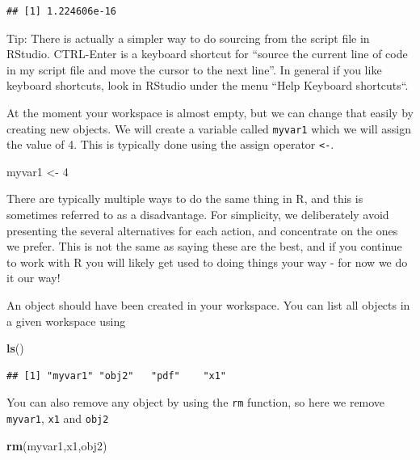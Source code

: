 \documentclass[]{book}
\newenvironment{Shaded}{\begin{snugshade}}{\end{snugshade}}
\newcommand{\KeywordTok}[1]{\textcolor[rgb]{0.13,0.29,0.53}{\textbf{#1}}}
\newcommand{\DecValTok}[1]{\textcolor[rgb]{0.00,0.00,0.81}{#1}}
\newcommand{\StringTok}[1]{\textcolor[rgb]{0.31,0.60,0.02}{#1}}
\newcommand{\NormalTok}[1]{#1}
\theoremstyle{definition}
\theoremstyle{definition}
\theoremstyle{remark}
\begin{document}
\begin{verbatim}
## [1] 1.224606e-16
\end{verbatim}

Tip: There is actually a simpler way to do sourcing from the script file
in RStudio. CTRL-Enter is a keyboard shortcut for ``source the current
line of code in my script file and move the cursor to the next line''.
In general if you like keyboard shortcuts, look in RStudio under the
menu ``Help \textbar{} Keyboard shortcuts``.

At the moment your workspace is almost empty, but we can change that
easily by creating new objects. We will create a variable called
\texttt{myvar1} which we will assign the value of 4. This is typically
done using the assign operator \texttt{\textless{}-}.

\begin{Shaded}
\begin{Highlighting}[]
\NormalTok{myvar1 <-}\StringTok{ }\DecValTok{4}
\end{Highlighting}
\end{Shaded}

There are typically multiple ways to do the same thing in R, and this is
sometimes referred to as a disadvantage. For simplicity, we deliberately
avoid presenting the several alternatives for each action, and
concentrate on the ones we prefer. This is not the same as saying these
are the best, and if you continue to work with R you will likely get
used to doing things your way - for now we do it our way!

An object should have been created in your workspace. You can list all
objects in a given workspace using

\begin{Shaded}
\begin{Highlighting}[]
\KeywordTok{ls}\NormalTok{()}
\end{Highlighting}
\end{Shaded}

\begin{verbatim}
## [1] "myvar1" "obj2"   "pdf"    "x1"
\end{verbatim}

You can also remove any object by using the \texttt{rm} function, so
here we remove \texttt{myvar1}, \texttt{x1} and \texttt{obj2}

\begin{Shaded}
\begin{Highlighting}[]
\KeywordTok{rm}\NormalTok{(myvar1,x1,obj2)}
\end{Highlighting}
\end{Shaded}
\end{document}
